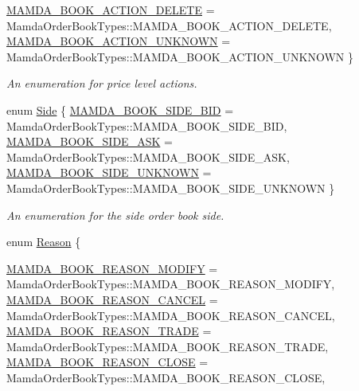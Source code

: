 \begin{CompactItemize}
\hyperlink{classWombat_1_1MamdaOrderBookPriceLevel_bd3407b4250fc6f7a42d94b6d32e358a8952762a05dabfc494c818260f0e91bc}{MAMDA\_\-BOOK\_\-ACTION\_\-DELETE} =  Mamda\-Order\-Book\-Types::MAMDA\_\-BOOK\_\-ACTION\_\-DELETE, 
\hyperlink{classWombat_1_1MamdaOrderBookPriceLevel_bd3407b4250fc6f7a42d94b6d32e358a830091d42d6e0cfc4fb0e115f530b93a}{MAMDA\_\-BOOK\_\-ACTION\_\-UNKNOWN} =  Mamda\-Order\-Book\-Types::MAMDA\_\-BOOK\_\-ACTION\_\-UNKNOWN
 \}
\begin{CompactList}\small\item\em An enumeration for price level actions. \item\end{CompactList}\item 
enum \hyperlink{classWombat_1_1MamdaOrderBookPriceLevel_384c34b0a74d874b8969dee9b0d3718d}{Side} \{ \hyperlink{classWombat_1_1MamdaOrderBookPriceLevel_384c34b0a74d874b8969dee9b0d3718d36006736894184b2ba382d5035ff588a}{MAMDA\_\-BOOK\_\-SIDE\_\-BID} =  Mamda\-Order\-Book\-Types::MAMDA\_\-BOOK\_\-SIDE\_\-BID, 
\hyperlink{classWombat_1_1MamdaOrderBookPriceLevel_384c34b0a74d874b8969dee9b0d3718d1f849c81b23e8305763bb4171c7fdda1}{MAMDA\_\-BOOK\_\-SIDE\_\-ASK} =  Mamda\-Order\-Book\-Types::MAMDA\_\-BOOK\_\-SIDE\_\-ASK, 
\hyperlink{classWombat_1_1MamdaOrderBookPriceLevel_384c34b0a74d874b8969dee9b0d3718d383262f728a83e872ceeea39a7ddec3e}{MAMDA\_\-BOOK\_\-SIDE\_\-UNKNOWN} =  Mamda\-Order\-Book\-Types::MAMDA\_\-BOOK\_\-SIDE\_\-UNKNOWN
 \}
\begin{CompactList}\small\item\em An enumeration for the side order book side. \item\end{CompactList}\item 
enum \hyperlink{classWombat_1_1MamdaOrderBookPriceLevel_cef40c91570e45ff2313cfe91c42910f}{Reason} \{ \par
\hyperlink{classWombat_1_1MamdaOrderBookPriceLevel_cef40c91570e45ff2313cfe91c42910fae81a622baef0ffa76bf3ada9ec41e23}{MAMDA\_\-BOOK\_\-REASON\_\-MODIFY} =  Mamda\-Order\-Book\-Types::MAMDA\_\-BOOK\_\-REASON\_\-MODIFY, 
\hyperlink{classWombat_1_1MamdaOrderBookPriceLevel_cef40c91570e45ff2313cfe91c42910f56ea2dee55a9b51874e0d9f35144ca8a}{MAMDA\_\-BOOK\_\-REASON\_\-CANCEL} =  Mamda\-Order\-Book\-Types::MAMDA\_\-BOOK\_\-REASON\_\-CANCEL, 
\hyperlink{classWombat_1_1MamdaOrderBookPriceLevel_cef40c91570e45ff2313cfe91c42910fd256f37e47081685573fb7e045059830}{MAMDA\_\-BOOK\_\-REASON\_\-TRADE} =  Mamda\-Order\-Book\-Types::MAMDA\_\-BOOK\_\-REASON\_\-TRADE, 
\hyperlink{classWombat_1_1MamdaOrderBookPriceLevel_cef40c91570e45ff2313cfe91c42910f2efec8bad77b76e5501957e505cf2c74}{MAMDA\_\-BOOK\_\-REASON\_\-CLOSE} =  Mamda\-Order\-Book\-Types::MAMDA\_\-BOOK\_\-REASON\_\-CLOSE, 

\end{CompactItemize}
